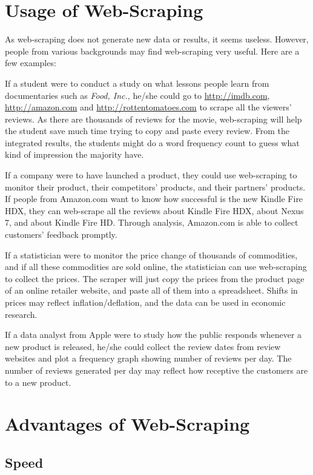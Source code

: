 \documentclass[12pt,twoside,draft]{report}
\begin{document}
\section{Usage of Web-Scraping}
As web-scraping does not generate new data or results, it seems useless. However, people from various backgrounds may find web-scraping very useful. Here are a few examples:

If a student were to conduct a study on what lessons people learn from documentaries such as \textit{Food, Inc.}, he/she could go to \url{http://imdb.com}, \url{http://amazon.com} and \url{http://rottentomatoes.com} to scrape all the viewers' reviews. As there are thousands of reviews for the movie, web-scraping will help the student save much time trying to copy and paste every review. From the integrated results, the students might do a word frequency count to guess what kind of impression the majority have.

If a company were to have launched a product, they could use web-scraping to monitor their product, their competitors' products, and their partners' products. If people from Amazon.com  want to know how successful is the new Kindle Fire HDX, they can web-scrape all the reviews about Kindle Fire HDX, about Nexus 7, and about Kindle Fire HD. Through analysis, Amazon.com is able to collect customers' feedback promptly.

If a statistician were to monitor the price change of thousands of commodities, and if all these commodities are sold online, the statistician can use web-scraping to collect the prices. The scraper will just copy the prices from the product page of an online retailer website, and paste all of them into a spreadsheet. Shifts  in prices may reflect inflation/deflation, and the data can be used in economic research.

If a data analyst from Apple were to study how the public responds whenever a new product is released, he/she could collect the review dates from review websites and plot a frequency graph showing number of reviews per day. The number of reviews generated per day may reflect how receptive the customers are to a new product.

\section{Advantages of Web-Scraping}

\subsection{Speed}
\end{document}
